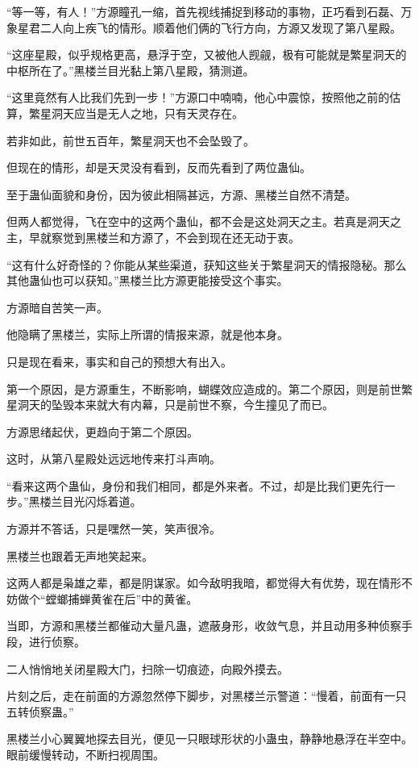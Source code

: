 \begin{this_body}
“等一等，有人！”方源瞳孔一缩，首先视线捕捉到移动的事物，正巧看到石磊、万象星君二人向上疾飞的情形。顺着他们俩的飞行方向，方源又发现了第八星殿。

“这座星殿，似乎规格更高，悬浮于空，又被他人觊觎，极有可能就是繁星洞天的中枢所在了。”黑楼兰目光黏上第八星殿，猜测道。

“这里竟然有人比我们先到一步！”方源口中喃喃，他心中震惊，按照他之前的估算，繁星洞天应当是无人之地，只有天灵存在。

若非如此，前世五百年，繁星洞天也不会坠毁了。

但现在的情形，却是天灵没有看到，反而先看到了两位蛊仙。

至于蛊仙面貌和身份，因为彼此相隔甚远，方源、黑楼兰自然不清楚。

但两人都觉得，飞在空中的这两个蛊仙，都不会是这处洞天之主。若真是洞天之主，早就察觉到黑楼兰和方源了，不会到现在还无动于衷。

“这有什么好奇怪的？你能从某些渠道，获知这些关于繁星洞天的情报隐秘。那么其他蛊仙也可以获知。”黑楼兰比方源更能接受这个事实。

方源暗自苦笑一声。

他隐瞒了黑楼兰，实际上所谓的情报来源，就是他本身。

只是现在看来，事实和自己的预想大有出入。

第一个原因，是方源重生，不断影响，蝴蝶效应造成的。第二个原因，则是前世繁星洞天的坠毁本来就大有内幕，只是前世不察，今生撞见了而已。

方源思绪起伏，更趋向于第二个原因。

这时，从第八星殿处远远地传来打斗声响。

“看来这两个蛊仙，身份和我们相同，都是外来者。不过，却是比我们更先行一步。”黑楼兰目光闪烁着道。

方源并不答话，只是嘿然一笑，笑声很冷。

黑楼兰也跟着无声地笑起来。

这两人都是枭雄之辈，都是阴谋家。如今敌明我暗，都觉得大有优势，现在情形不妨做个“螳螂捕蝉黄雀在后”中的黄雀。

当即，方源和黑楼兰都催动大量凡蛊，遮蔽身形，收敛气息，并且动用多种侦察手段，进行侦察。

二人悄悄地关闭星殿大门，扫除一切痕迹，向殿外摸去。

片刻之后，走在前面的方源忽然停下脚步，对黑楼兰示警道：“慢着，前面有一只五转侦察蛊。”

黑楼兰小心翼翼地探去目光，便见一只眼球形状的小蛊虫，静静地悬浮在半空中。眼前缓慢转动，不断扫视周围。


\end{this_body}
